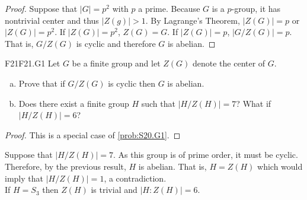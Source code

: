 \documentclass[../AlgebraQualSolutions.tex]{subfiles}
\begin{document}
	\begin{proof}
	Suppose that $|G| = p^2$ with $p$ a prime. Because $G$ is a $p$-group, it has nontrivial center and thus $|Z(g)| > 1$. By Lagrange's Theorem, $|Z(G)| = p$ or $|Z(G)| = p^2$. If $|Z(G)| =p^2$, $Z(G) = G$. If $|Z(G)| = p$, $\left|G/Z(G) \right| = p$. That is, $G/Z(G)$ is cyclic and therefore $G$ is abelian.
	\end{proof}
	
	\begin{prob}{F21}{F21.G1}
	Let $G$ be a finite group and let $Z(G)$ denote the center of $G$.
	\begin{enumerate}[(a)]
	\item Prove that if $G/Z(G)$ is cyclic then $G$ is abelian.
	\item Does there exist a finite group $H$ such that $|H/Z(H)| = 7$? What if $|H/Z(H)| = 6$?
	\end{enumerate}
	\end{prob}
	
	\begin{proof}
	This is a special case of \ref{prob:S20.G1}.
	\end{proof}
	
	\begin{solution}
	Suppose that $|H/Z(H)| = 7$. As this group is of prime order, it must be cyclic. Therefore, by the previous result, $H$ is abelian. That is, $H = Z(H)$ which would imply that $|H/Z(H)| = 1$, a contradiction.\\
	
	If $H = S_3$ then $Z(H)$ is trivial and $|H: Z(H)| = 6$.
	\end{solution}
\end{document}
